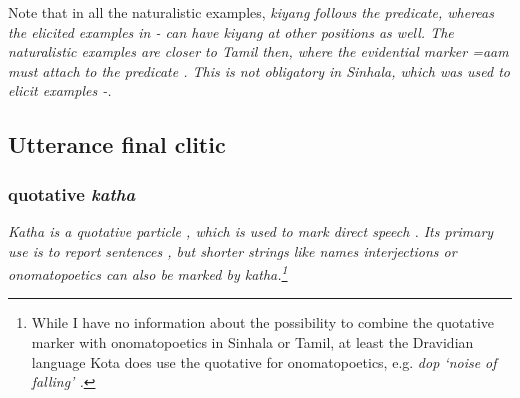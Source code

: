 Note that in all the naturalistic examples, \em kiyang \em follows the predicate, whereas the elicited examples in - can have \em kiyang \em at other positions as well. The naturalistic examples are closer to Tamil then, where the evidential marker \em =aam \em  must attach to the predicate \citep[165]{SmithEtAl2006cll}. This is not obligatory in Sinhala, which was used to elicit examples -.
 

\glossSTDmode
\subsection{Utterance final clitic}\label{sec:morph:Utterancefinalclitic}
\subsubsection{quotative \em katha\em}\label{sec:morph:katha}
\em Katha \em is a quotative particle \citep{Bakker2000convergence},  which is used to mark direct speech \citep{SmithEtAl2004} . Its primary use is to report sentences , but shorter strings like names  interjections  or onomatopoetics  can also be marked by \em katha\em.\footnote{While I have no information about the possibility to combine the quotative marker with onomatopoetics in Sinhala or Tamil, at least the Dravidian language Kota does use the quotative for onomatopoetics, e.g.  \em dop \em `noise of falling' \citep{Emeneau1969ono}.}



